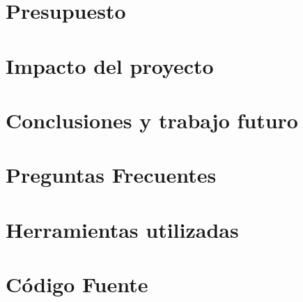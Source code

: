 \documentclass[12pt,a4paper]{report}
\begin{document}
% 

\chapter{Presupuesto}
\label{sec:cap4}


\chapter{Impacto del proyecto}
\label{sec:cap5}


\chapter{Conclusiones y trabajo futuro}
\label{sec:cap6}


\nocite{librodeldragon}
\nocite{ide}
\nocite{intro}
\nocite{primerproyectojavacc}
\nocite{robertfisher}
\nocite{xquery}
\nocite{oracle}
\nocite{netbeans}
\label{sec:bibliografía}
\printbibliography


\appendix
\label{sec:apendice}
\chapter{Preguntas Frecuentes}

\chapter{Herramientas utilizadas}

\chapter{Código Fuente}
\label{sec:codigofuente}

\end{document}
